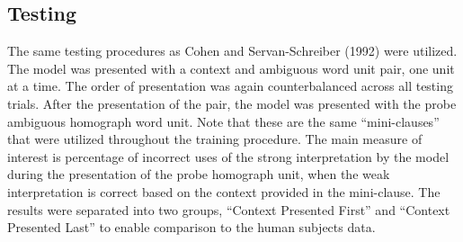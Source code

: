 \documentclass[man]{apa}
\begin{document}
\subsection{Testing}
The same testing procedures as Cohen and Servan-Schreiber (1992) were utilized.  The model was presented with a context and ambiguous word unit pair, one unit at a time.  The order of presentation was again counterbalanced across all testing trials.  After the presentation of the pair, the model was presented with the probe ambiguous homograph word unit.  Note that these are the same ``mini-clauses'' that were utilized throughout the training procedure. The main measure of interest is percentage of incorrect uses of the strong interpretation by the model during the presentation of the probe homograph unit, when the weak interpretation is correct based on the context provided in the mini-clause.  The results were separated into two groups, ``Context Presented First'' and ``Context Presented Last'' to enable comparison to the human subjects data.
\end{document}
